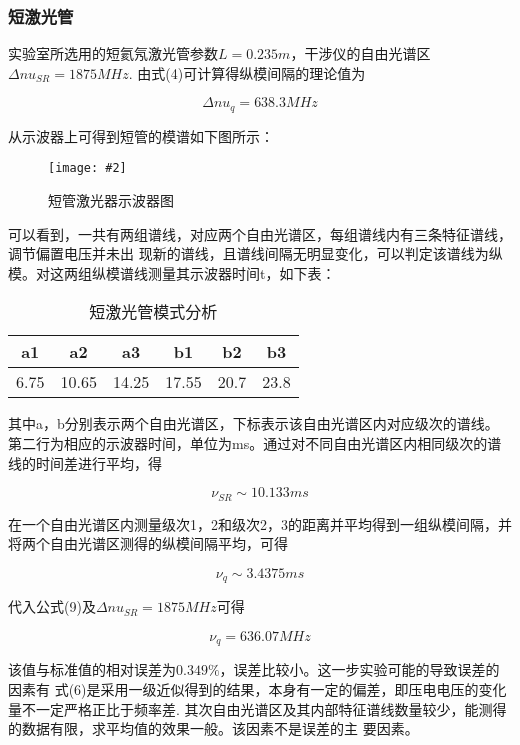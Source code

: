 \documentclass[12pt,a4paper]{article}
\newcommand{\be}[1]{
    \begin{equation}
        #1
    \end{equation}
}
\newcommand{\bfig}[3]{
    \begin{figure}[H]
        \centering
        \texttt{[image: \#2]}
        \caption{#3}
    \end{figure}
}
\begin{document}
\subsubsection{短激光管}
实验室所选用的短氦氖激光管参数$L=0.235m$，干涉仪的自由光谱区$\Delta nu_{SR}=1875MHz$. 由式(4)可计算得纵模间隔的理论值为
\be{\Delta nu_q=638.3MHz}
从示波器上可得到短管的模谱如下图所示：
\bfig{0.6}{短管激光器示意图.jpeg}{短管激光器示波器图}
可以看到，一共有两组谱线，对应两个自由光谱区，每组谱线内有三条特征谱线，调节偏置电压并未出
现新的谱线，且谱线间隔无明显变化，可以判定该谱线为纵模。对这两组纵模谱线测量其示波器时间t，如下表：
\begin{table}[htbp]
    \centering
    \caption{短激光管模式分析}
    \begin{tabular}{|c|c|c|c|c|c|}
    \hline
    a1   & a2    & a3    & b1    & b2   & b3   \\ \hline
    6.75 & 10.65 & 14.25 & 17.55 & 20.7 & 23.8 \\ \hline
    \end{tabular}
    \end{table}
其中a，b分别表示两个自由光谱区，下标表示该自由光谱区内对应级次的谱线。第二行为相应的示波器时间，单位为ms。通过对不同自由光谱区内相同级次的谱线的时间差进行平均，得
\be{\nu_{SR}\sim 10.133ms}
在一个自由光谱区内测量级次1，2和级次2，3的距离并平均得到一组纵模间隔，并将两个自由光谱区测得的纵模间隔平均，可得
\be{\nu_q\sim 3.4375ms}
代入公式(9)及$\Delta nu_{SR}=1875MHz$可得
\be{\nu_q=636.07MHz}
该值与标准值的相对误差为$0.349\%$，误差比较小。这一步实验可能的导致误差的因素有
式(6)是采用一级近似得到的结果，本身有一定的偏差，即压电电压的变化量不一定严格正比于频率差.
其次自由光谱区及其内部特征谱线数量较少，能测得的数据有限，求平均值的效果一般。该因素不是误差的主
要因素。
\end{document}
